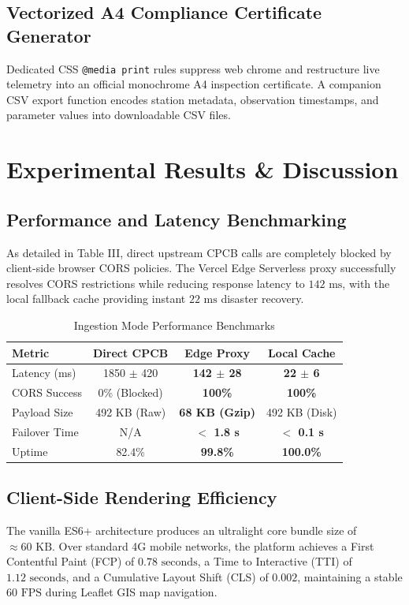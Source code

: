 \documentclass[conference]{IEEEtran}
\begin{document}
\subsection{Vectorized A4 Compliance Certificate Generator}
Dedicated CSS \texttt{@media print} rules suppress web chrome and restructure live telemetry into an official monochrome A4 inspection certificate. A companion CSV export function encodes station metadata, observation timestamps, and parameter values into downloadable CSV files.

\section{Experimental Results \& Discussion}
\subsection{Performance and Latency Benchmarking}
As detailed in Table III, direct upstream CPCB calls are completely blocked by client-side browser CORS policies. The Vercel Edge Serverless proxy successfully resolves CORS restrictions while reducing response latency to $142\text{ ms}$, with the local fallback cache providing instant $22\text{ ms}$ disaster recovery.

\begin{table}[htbp]
\caption{Ingestion Mode Performance Benchmarks}
\begin{center}
\begin{tabular}{lccc}
\toprule
\textbf{Metric} & \textbf{Direct CPCB} & \textbf{Edge Proxy} & \textbf{Local Cache} \\
\midrule
Latency (ms) & 1850 $\pm$ 420 & \textbf{142 $\pm$ 28} & \textbf{22 $\pm$ 6} \\
CORS Success & 0\% (Blocked) & \textbf{100\%} & \textbf{100\%} \\
Payload Size & 492 KB (Raw) & \textbf{68 KB (Gzip)} & 492 KB (Disk) \\
Failover Time & N/A & \textbf{$<$ 1.8 s} & \textbf{$<$ 0.1 s} \\
Uptime & 82.4\% & \textbf{99.8\%} & \textbf{100.0\%} \\
\bottomrule
\end{tabular}
\end{center}
\end{table}

\subsection{Client-Side Rendering Efficiency}
The vanilla ES6+ architecture produces an ultralight core bundle size of $\approx 60\text{ KB}$. Over standard 4G mobile networks, the platform achieves a First Contentful Paint (FCP) of $0.78\text{ seconds}$, a Time to Interactive (TTI) of $1.12\text{ seconds}$, and a Cumulative Layout Shift (CLS) of $0.002$, maintaining a stable $60\text{ FPS}$ during Leaflet GIS map navigation.
\end{document}
